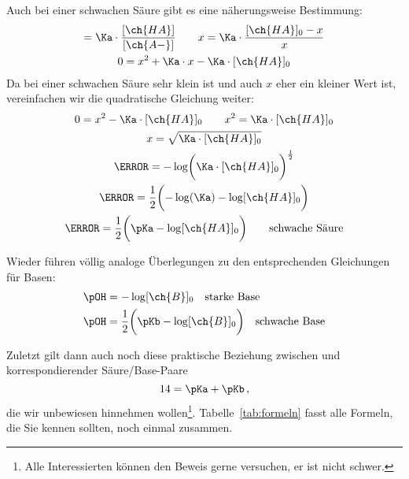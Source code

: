 \documentclass{scrartcl}
\begin{document}
Auch bei einer schwachen Säure gibt es eine näherungsweise Bestimmung:
\begin{gather}
  [\ch{H3O+}] = \Ka \cdot \frac{ [\ch{HA}] }{ [\ch{A-}] }
    \qquad  x = \Ka \cdot \frac{ [\ch{HA}]_0 - x }{ x } \\
  0 = x^2 + \Ka \cdot x - \Ka \cdot [\ch{HA}]_0
\end{gather}
Da bei einer schwachen Säure \Ka sehr klein ist und auch $x$ eher ein kleiner
Wert ist, vereinfachen wir die quadratische Gleichung weiter:
\begin{gather}
  0 = x^2 - \Ka \cdot [\ch{HA}]_0 \qquad x^2 = \Ka \cdot [\ch{HA}]_0 \\
  x = \sqrt{ \Ka \cdot [\ch{HA}]_0 } \\
  \pH = -\log\biggl(\Ka \cdot [\ch{HA}]_0 \biggr)^\frac{1}{2} \\
  \pH = \frac{1}{2} \biggl( -\log(\Ka) - \log[\ch{HA}]_0 \biggr) \\
  \pH = \frac{1}{2} \biggl( \pKa - \log[\ch{HA}]_0 \biggr)
    \qquad \text{schwache Säure}\label{eq:schwache_saeure}
\end{gather}

Wieder führen völlig analoge Überlegungen zu den entsprechenden Gleichungen
für Basen:
\begin{align}
  \pOH &= -\log[\ch{B}]_0 \quad \text{starke Base} \\
  \pOH &= \frac{1}{2} \biggl( \pKb - \log[\ch{B}]_0 \biggr)
    \quad \text{schwache Base}
\end{align}

Zuletzt gilt dann auch noch diese praktische Beziehung zwischen \pKa{} und
\pKb{}  korrespondierender
Säure/Base-Paare
\begin{equation}
  14 = \pKa + \pKb  \,,
\end{equation}
die wir unbewiesen hinnehmen wollen\footnote{Alle Interessierten können den
  Beweis gerne versuchen, er ist nicht schwer.}. Tabelle~\ref{tab:formeln}
fasst alle Formeln, die Sie kennen sollten, noch einmal zusammen.
\end{document}
